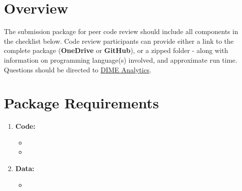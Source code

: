 \documentclass{tufte-handout}
\begin{document}
\thispagestyle{firstpage}
    \begin{fullwidth}


        \section*{Overview}
The submission package for peer code review should include all components in the checklist below. Code review participants can provide either a link to the complete package (\textbf{OneDrive} or \textbf{GitHub}), or a zipped folder - along with information on programming language(s) involved, and approximate run time. Questions should be directed to \href{mailto:dimeanalytics@worldbank.org}{DIME Analytics}.

        \section*{Package Requirements}
        \begin{enumerate}
        \item \textbf{Code:}
        \begin{itemize}
            \item[] 
            \item[]         \end{itemize}
          
          \item \textbf{Data:}  
          \begin{itemize}
            \item[] 
           \end{itemize}
           

\end{enumerate}
\end{fullwidth}
\end{document}
